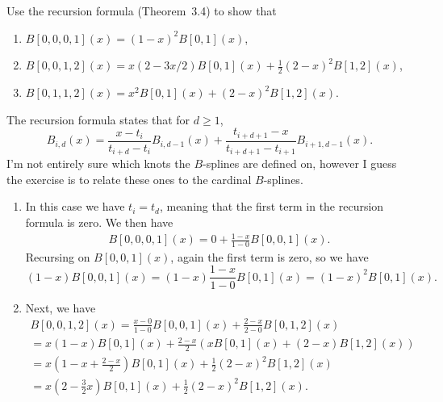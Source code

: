 \begin{exercise}
    Use the recursion formula (Theorem~3.4) to show that
    \begin{enumerate}[
    label=\alph*) %
            ] %
        \item $B[0, 0, 0, 1](x) = (1 - x)^2 B[0, 1](x)$,
        \item $B[0, 0, 1, 2](x) = x(2 - 3x/2)B[0, 1](x) + \frac{1}{2}(2 - x)^2B[1, 2](x)$,
        \item $B[0, 1, 1, 2](x) = x^2B[0, 1](x) + (2 - x)^2B[1, 2](x)$.
    \end{enumerate}
\end{exercise}

\begin{solution}
    The recursion formula states that for $d \geq 1$,
    \begin{equation*}
        B_{i, d}(x)
        = \frac{x - t_i}{t_{i+d} - t_i} B_{i, d-1}(x)
        + \frac{t_{i+d+1} - x}{t_{i+d+1} - t_{i+1}} B_{i+1, d-1}(x).
    \end{equation*}
    I'm not entirely sure which knots the $B$-splines are defined on, however I guess the exercise is to relate these ones to the cardinal $B$-splines.

    \begin{enumerate}[
    label=\alph*) %
            ] %
        \item In this case we have $t_i = t_d$, meaning that the first term in the recursion formula is zero.
            We then have
            \begin{align*}
                B[0, 0, 0, 1](x)
                = 0 + \frac{1 - x}{1 - 0} B[0, 0, 1](x).
            \end{align*}
            Recursing on $B[0, 0, 1](x)$, again the first term is zero, so we have
            \begin{equation*}
                (1 - x)B[0, 0, 1](x)
                = (1-x) \frac{1 - x}{1 - 0} B[0, 1](x)
                = (1 - x)^2 B[0, 1](x).
            \end{equation*}

        \item Next, we have
            \begin{gather*}
                B[0, 0, 1, 2](x)
                = \frac{x - 0}{1 - 0} B[0, 0, 1](x)
                + \frac{2 - x}{2 - 0} B[0, 1, 2](x) \\
                = x (1 - x) B[0, 1](x)
                + \frac{2 - x}{2} \left(
                    x B[0, 1](x)
                    + (2 - x) B[1, 2](x)
                \right) \\
                = x \left( 1 - x + \frac{2 - x}{2} \right) B[0, 1](x)
                + \frac{1}{2}(2 - x)^2 B[1, 2](x) \\
                = x \left( 2 - \frac{3}{2}x \right) B[0, 1](x)
                + \frac{1}{2}(2 - x)^2 B[1, 2](x).
            \end{gather*}


\end{enumerate}
\end{solution}
